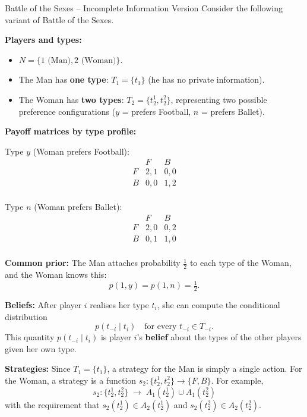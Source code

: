 \documentclass[12pt, a4paper]{article}
\begin{document}
\begin{exbox}{Battle of the Sexes -- Incomplete Information Version}
Consider the following variant of Battle of the Sexes.

\medskip
\noindent\textbf{Players and types:}
\begin{itemize}
  \item $N = \{1 \text{ (Man)}, 2 \text{ (Woman)}\}$.
  \item The Man has \textbf{one type}: $T_1 = \{t_1\}$ (he has no private information).
  \item The Woman has \textbf{two types}: $T_2 = \{t_2^1, t_2^2\}$, representing two possible preference configurations ($y$ = prefers Football, $n$ = prefers Ballet).
\end{itemize}

\medskip
\noindent\textbf{Payoff matrices by type profile:}

\medskip
Type $y$ (Woman prefers Football):
\[
  \begin{array}{r|cc}
              & F   & B   \\ \hline
    F         & 2,1 & 0,0 \\
    B         & 0,0 & 1,2 \\
  \end{array}
\]

\medskip
Type $n$ (Woman prefers Ballet):
\[
  \begin{array}{r|cc}
              & F   & B   \\ \hline
    F         & 2,0 & 0,2 \\
    B         & 0,1 & 1,0 \\
  \end{array}
\]

\medskip
\noindent\textbf{Common prior:} The Man attaches probability $\tfrac{1}{2}$ to each type of the Woman, and the Woman knows this:
\[
  p(1, y) = p(1, n) = \tfrac{1}{2}.
\]

\medskip
\noindent\textbf{Beliefs:} After player $i$ realises her type $t_i$, she can compute the conditional distribution
\[
  p(t_{-i} \mid t_i) \quad \text{for every } t_{-i} \in T_{-i}.
\]
This quantity $p(t_{-i} \mid t_i)$ is player $i$'s \textbf{belief} about the types of the other players given her own type.

\medskip
\noindent\textbf{Strategies:} Since $T_1 = \{t_1\}$, a strategy for the Man is simply a single action. For the Woman, a strategy is a function $s_2 : \{t_2^1, t_2^2\} \to \{F, B\}$. For example,
\[
  s_2 : \{t_2^1, t_2^2\} \;\longrightarrow\; A_1(t_2^1) \cup A_1(t_2^2)
\]
with the requirement that $s_2(t_2^1) \in A_2(t_2^1)$ and $s_2(t_2^2) \in A_2(t_2^2)$.


\end{exbox}
\end{document}
